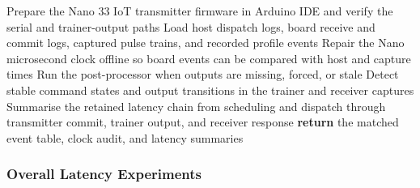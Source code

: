 \vspace{0.70cm}

\begin{algorithm}[H]
\small
\setlength{\baselineskip}{1.15\baselineskip}
\caption{Nano transmitter end-to-end latency test}
\label{alg:latency_transmitter_nano_e2e}
Prepare the Nano 33 IoT transmitter firmware in Arduino IDE and verify the serial and trainer-output paths\;
Load host dispatch logs, board receive and commit logs, captured pulse trains, and recorded profile events\;
Repair the Nano microsecond clock offline so board events can be compared with host and capture times\;
Run the post-processor when outputs are missing, forced, or stale\;
Detect stable command states and output transitions in the trainer and receiver captures\;
Summarise the retained latency chain from scheduling and dispatch through transmitter commit, trainer output, and receiver response\;
\textbf{return} the matched event table, clock audit, and latency summaries\;
\end{algorithm}

\cleardoublepage

\phantom{.}

\vspace{0.50cm}

\subsubsection{Overall Latency Experiments}\label{sec:latency_overall_pseudocode}

\vspace{0.30cm}

